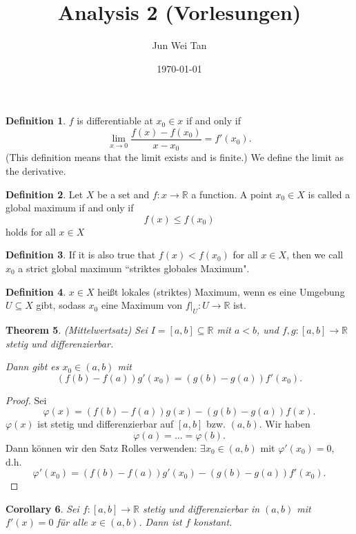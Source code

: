 \documentclass[prb,12pt]{revtex4-2}
\newtheorem{Theorem}{Theorem}
\newtheorem{Corollary}[Theorem]{Corollary}
\theoremstyle{definition}
\theoremstyle{definition}
\newtheorem{Definition}[Theorem]{Definition}
\newcommand{\R}{\mathbb{R}}
\begin{document}
	\title{Analysis 2 (Vorlesungen)}
	\author{Jun Wei Tan}
	\date{\today}
	\maketitle
\begin{Definition}
	$f$ is differentiable at $x_0\in x$ if and only if
	\[
	\lim_{x \to 0} \frac{f(x)-f(x_0)}{x-x_0}=f'(x_0)
	.\] 
	(This definition means that the limit exists and is finite.) We define the limit as the derivative.
\end{Definition}

\begin{Definition}
	Let $X$ be a set and $f:x\to \R$ a function. A point $x_0\in X$ is called a global maximum if and only if
	 \[
	f(x)\le f(x_0)
	\] 
	holds for all $x\in X$
\end{Definition}

\begin{Definition}
	If it is also true that $f(x)<f(x_0)$ for all $x\in X$, then we call $x_0$ a strict global maximum ``striktes globales Maximum".
\end{Definition}

\begin{Definition}
	$x\in X$ heißt lokales (striktes) Maximum, wenn es eine Umgebung $U \subseteq X$ gibt, sodass $x_0$ eine Maximum von $f|_U:U\to \R$ ist. 
\end{Definition}

\begin{Theorem}
	(Mittelwertsatz) Sei $I=[a,b]\subseteq \R$ mit $a<b$, und $f,g:[a,b]\to \R$ stetig und differenzierbar. 

	Dann gibt es $x_0\in (a,b)$ mit
	\[
		\left( f(b)-f(a) \right) g'(x_0)=\left( g(b)-g(a) \right) f'(x_0)
	.\] 
\end{Theorem}

\begin{proof}
	Sei
	\[
	\varphi(x)=\left( f(b)-f(a) \right) g(x)-\left( g(b)-g(a) \right) f(x)
	.\] 
	$\varphi(x)$ ist stetig und differenzierbar auf $[a,b]$ bzw. $(a,b)$. Wir haben
	\[
	\varphi(a)=\dots=\varphi(b)
	.\] 
	Dann k\"{o}nnen wir den Satz Rolles verwenden: $\exists x_0\in (a,b)$ mit $\varphi'(x_0)=0$, d.h.
	\[
	\varphi'(x_0)=\left( f(b)-f(a) \right) g'(x_0)-\left( g(b)-g(a) \right) f'(x_0)
	.\] 
\end{proof}

\begin{Corollary}
	Sei $f:[a,b]\to \R$ stetig und differenzierbar in $(a,b)$ mit $f'(x)=0$ f\"{u}r alle $x\in (a,b)$. Dann ist $f$ konstant.
\end{Corollary}
\end{document}
